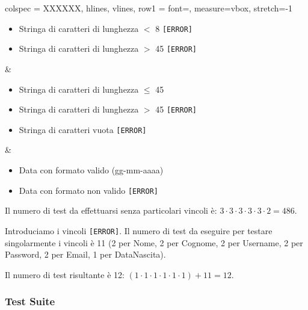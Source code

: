 \begin{table}[!hbp]
\begin{tblr}{
		colspec = XXXXXX,
		hlines, vlines,
		row{1} = {font=\bfseries},
		measure=vbox, stretch=-1
		}
\begin{itemize}[leftmargin=*]
			\item Stringa di caratteri di lunghezza $<$ 8 \texttt{[ERROR]}
			\item Stringa di caratteri di lunghezza $>$ 45 \texttt{[ERROR]}
		\end{itemize} &
		\begin{itemize}[leftmargin=*]
			\item Stringa di caratteri di lunghezza $\leq$ 45
			\item Stringa di caratteri di lunghezza $>$ 45 \texttt{[ERROR]}
			\item Stringa di caratteri vuota \texttt{[ERROR]}
		\end{itemize} &
		\begin{itemize}[leftmargin=*]
			\item Data con formato valido (gg-mm-aaaa)
			\item Data con formato non valido \texttt{[ERROR]}
		\end{itemize}
	\end{tblr}
\end{table}

\noindent Il numero di test da effettuarsi senza particolari vincoli è: $3 \cdot 3 \cdot 3 \cdot 3 \cdot 3 \cdot 2 = 486$.

\noindent Introduciamo i vincoli \texttt{[ERROR]}. Il numero di test da eseguire per testare singolarmente i vincoli è 11 (2 per Nome, 2 per Cognome, 2 per Username, 2 per Password, 2 per Email, 1 per DataNascita).

\noindent Il numero di test risultante è 12: $(1 \cdot 1 \cdot 1 \cdot 1 \cdot 1 \cdot 1) + 11 = 12$.

\subsubsection*{Test Suite}

